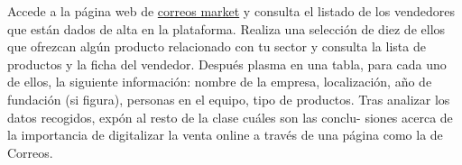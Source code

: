 


%
%
%


Accede a la página web de \href{https://bit.ly/491sErk}{correos market} y consulta el listado de los vendedores que están dados de alta en la plataforma. Realiza una selección de diez de ellos que ofrezcan algún producto relacionado con tu sector y consulta la lista de productos y la ficha del vendedor. Después plasma en una tabla, para cada uno de ellos, la siguiente información: nombre de la empresa, localización, año de fundación (si figura), personas en el equipo, tipo de productos. Tras analizar los datos recogidos, expón al resto de la clase cuáles son las conclu- siones acerca de la importancia de digitalizar la venta online a través de una página como la de Correos.
\vspace{2em}

